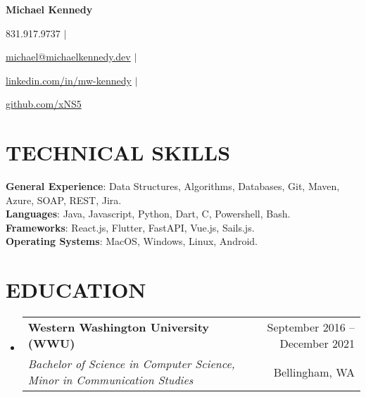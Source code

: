\documentclass[letterpaper,11pt]{article}
\makeatletter
\newcommand{\resumeSubheading}[4]{
        \vspace{-1pt}\item
        \begin{tabular*}{\textwidth}[t]{l@{\extracolsep{\fill}}r}
            \textbf{#1} & {\color{dark-grey}\small #2}\vspace{1pt}\\ %
            \textit{#3} & {\color{dark-grey} \small #4}\\ %
        \end{tabular*}\vspace{-4pt}
    }
\newcommand{\resumeSubHeadingListStart}{\begin{itemize}[leftmargin=0in, label={}]}
\newcommand{\resumeSubHeadingListEnd}{\end{itemize}}
\newif\ifdisablesymbol
\newcommand{\rendericon}[1]{%
        \ifdisablesymbol
    \else
        #1
    \fi
}
\makeatother
\begin{document}

\begin{center}
    \textbf{\Huge Michael Kennedy} \\ \vspace{5pt}
    \small \rendericon{\faPhone\hspace{2pt}}831.917.9737 \hspace{1pt} $|$
    \hspace{1pt} \rendericon{\faEnvelope\hspace{2pt} }\href{mailto:michael@michaelkennedy.dev}{michael@michaelkennedy.dev} \hspace{1pt} $|$ 
    \hspace{1pt} \rendericon{\faLinkedinSquare\hspace{2pt}} \href{https://www.linkedin.com/in/mw-kennedy}{linkedin.com/in/mw-kennedy} \hspace{1pt}$|$
    \hspace{1pt} \rendericon{\faGithubSquare\hspace{2pt}} \href{https://github.com/xNS5}{github.com/xNS5}
    \\ \vspace{-3pt}
\end{center}

\section{TECHNICAL SKILLS}
\begin{itemize}[leftmargin=0in, label={}]
    \small{\item{
            \textbf{General Experience}{: Data Structures, Algorithms, Databases, Git, Maven, Azure, SOAP, REST, Jira.}\\
            \textbf{Languages}{: Java, Javascript, Python, Dart, C, Powershell, Bash.} \\
            \textbf{Frameworks}{: React.js, Flutter, FastAPI, Vue.js, Sails.js.}\\
            \textbf{Operating Systems}{: MacOS, Windows, Linux, Android.}
    }}
\end{itemize}

\section {EDUCATION}
\resumeSubHeadingListStart
\resumeSubheading
{Western Washington University (WWU)}{September 2016 -- December 2021}
{Bachelor of Science in Computer Science, Minor in Communication Studies}{Bellingham, WA} 
\resumeSubHeadingListEnd
\end{document}
